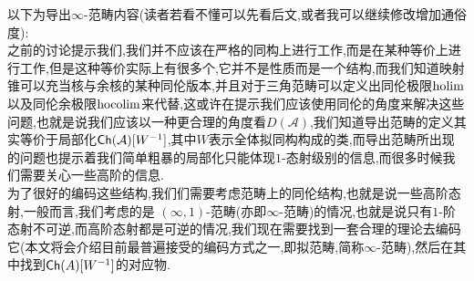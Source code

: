 以下为导出$\infty$-范畴内容(读者若看不懂可以先看后文,或者我可以继续修改增加通俗度):\\

之前的讨论提示我们,我们并不应该在严格的同构上进行工作,而是在某种等价上进行工作,但是这种等价实际上有很多个,它并不是性质而是一个结构,而我们知道映射锥可以充当核与余核的某种同伦版本,并且对于三角范畴可以定义出同伦极限$\operatorname{holim}$以及同伦余极限$\operatorname{hocolim}$来代替,这或许在提示我们应该使用同伦的角度来解决这些问题,也就是说我们应该以一种更合理的角度看$D(\mathcal{A})$,我们知道导出范畴的定义其实等价于局部化$\mathsf{Ch}(\mathcal{A})[W^{-1}]$,其中$W$表示全体拟同构构成的类,而导出范畴所出现的问题也提示着我们简单粗暴的局部化只能体现$1$-态射级别的信息,而很多时候我们需要关心一些高阶的信息.\\

为了很好的编码这些结构,我们们需要考虑范畴上的同伦结构,也就是说一些高阶态射,一般而言,我们考虑的是 $(\infty,1)$-范畴(亦即$\infty$-范畴)的情况,也就是说只有$1$-阶态射不可逆,而高阶态射都是可逆的情况,我们现在需要找到一套合理的理论去编码它(本文将会介绍目前最普遍接受的编码方式之一,即拟范畴,简称$\infty$-范畴),然后在其中找到$\mathsf{Ch}(A)[W^{-1}]$的对应物.\\

